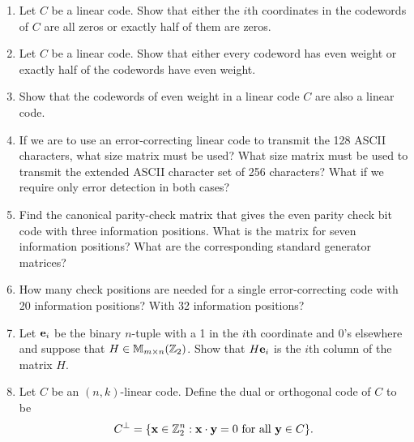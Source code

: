 {\begin{enumerate}
\begin{enumerate}
\end{enumerate}
In other words, a metric is simply a generalization of the notion of
distance. Prove that Hamming distance is a metric on ${\Bbb Z}_2^n$.
Decoding a message actually reduces to deciding which is the closest
codeword in terms of distance.
 
 
\bf\item\rm
Let $C$ be a linear code. Show that either the $i$th coordinates in the
codewords of $C$ are all zeros or exactly half of them are zeros. 
 
 
\bf\item\rm
Let $C$ be a linear code. Show that either every codeword has even
weight or exactly half of the codewords have even weight.
 
 
\bf\item\rm
Show that the codewords of even weight in a linear code $C$ are also a
linear code. 
 
 
 
 
\bf\item\rm
If we are to use an error-correcting linear code to transmit the 128
ASCII characters, what size matrix must be used? What size matrix must
be used to transmit the extended ASCII character set of 256
characters?  What if we require only error detection in both cases?
 
 
\bf\item\rm
Find the canonical parity-check matrix that gives the even
parity check bit code with three information positions. What is the
matrix for seven information positions?  What are the corresponding
standard generator matrices? 
 
 
\bf\item\rm
How many check positions are needed for a single error-correcting code
with 20 information positions? With 32 information positions?
 
 
 
\bf\item\rm
Let ${\bold e}_i$ be the binary $n$-tuple with a 1 in the $i$th
coordinate and $0$'s elsewhere and suppose that $H \in {\Bbb M}_{m
\times n}({\Bbb Z}_2)$. Show that $H{\bold e}_i$ is the $i$th
column of the matrix $H$. 
 
 
\bf\item\rm
Let $C$ be an $(n,k)$-linear code. Define the {\bfi
dual\/} or {\bfi orthogonal code\/} of $C$  to be 
\[
C^\perp = \{ {\bold x} \in {\Bbb Z}_2^n :  {\bold x} \cdot {\bold y} =
0 \mbox{ for all } {\bold y} \in C \}. 
\]
\begin{enumerate}
 

\end{enumerate}
\end{enumerate}}
